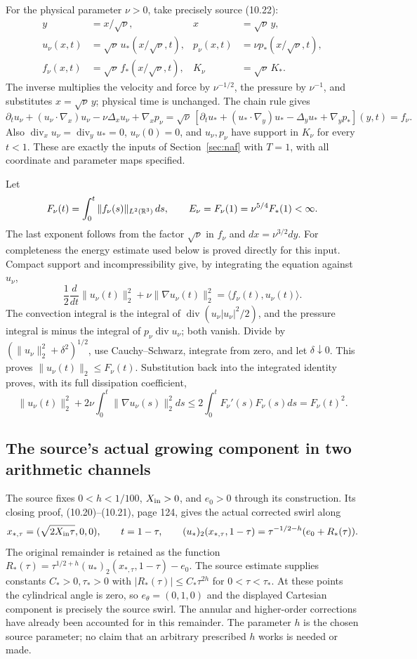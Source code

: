 For the physical parameter $\nu>0$, take precisely source (10.22):
\begin{align*}
 y&=x/\sqrt\nu, & x&=\sqrt\nu\,y,\\
 u_\nu(x,t)&=\sqrt\nu\,u_*(x/\sqrt\nu,t),&
 p_\nu(x,t)&=\nu p_*(x/\sqrt\nu,t),\\
 f_\nu(x,t)&=\sqrt\nu\,f_*(x/\sqrt\nu,t),&
 K_\nu&=\sqrt\nu\,K_*.
\end{align*}
The inverse multiplies the velocity and force by $\nu^{-1/2}$,
the pressure by $\nu^{-1}$, and substitutes $x=\sqrt\nu\,y$;
physical time is unchanged. The chain rule gives
\[
 \partial_tu_\nu+(u_\nu\cdot\nabla_x)u_\nu
       -\nu\Delta_xu_\nu+\nabla_xp_\nu
 =\sqrt\nu\,[\partial_tu_*+(u_*\cdot\nabla_y)u_*
                    -\Delta_yu_*+\nabla_yp_*](y,t)=f_\nu.
\]
Also $\operatorname{div}_xu_\nu=\operatorname{div}_yu_*=0$,
$u_\nu(0)=0$, and $u_\nu,p_\nu$ have support in $K_\nu$ for every
$t<1$. These are exactly the inputs of Section~\ref{sec:naf} with
$T=1$, with all coordinate and parameter maps specified.

Let
\[
 F_\nu(t)=\int_0^t\|f_\nu(s)\|_{L^2(\mathbb R^3)}\,ds,
 \qquad E_\nu=F_\nu(1)=\nu^{5/4}F_*(1)<\infty.
\]
The last exponent follows from the factor $\sqrt\nu$ in $f_\nu$ and
$dx=\nu^{3/2}dy$. For completeness the energy estimate used below is
proved directly for this input. Compact support and incompressibility
give, by integrating the equation against $u_\nu$,
\[
 \frac12\frac{d}{dt}\|u_\nu(t)\|_2^2
       +\nu\|\nabla u_\nu(t)\|_2^2
       =\langle f_\nu(t),u_\nu(t)\rangle.
\]
The convection integral is the integral of
$\operatorname{div}(u_\nu|u_\nu|^2/2)$, and the pressure integral is
minus the integral of $p_\nu\operatorname{div}u_\nu$; both vanish.
Divide by $(\|u_\nu\|_2^2+\delta^2)^{1/2}$, use Cauchy--Schwarz,
integrate from zero, and let $\delta\downarrow0$. This proves
$\|u_\nu(t)\|_2\leq F_\nu(t)$. Substitution back into the integrated
identity proves, with its full dissipation coefficient,
\[
 \|u_\nu(t)\|_2^2+2\nu\int_0^t\|\nabla u_\nu(s)\|_2^2ds
 \leq 2\int_0^t F_\nu'(s)F_\nu(s)ds=F_\nu(t)^2.
\]

\subsection*{The source's actual growing component in two arithmetic channels}

The source fixes $0<h<1/100$, $X_{\rm in}>0$, and $e_0>0$ through
its construction. Its closing proof, (10.20)--(10.21), page 124, gives
the actual corrected swirl along
\[
 x_{*,\tau}=(\sqrt{2X_{\rm in}\tau},0,0),\qquad t=1-\tau,
 \qquad
 (u_*)_2(x_{*,\tau},1-\tau)
   =\tau^{-1/2-h}(e_0+R_*(\tau)).
\]
The original remainder is retained as the function
$R_*(\tau)=\tau^{1/2+h}(u_*)_2(x_{*,\tau},1-\tau)-e_0$.
The source estimate supplies constants $C_*>0,\tau_*>0$ with
$|R_*(\tau)|\leq C_*\tau^{2h}$ for $0<\tau<\tau_*$.
At these points the cylindrical angle is zero, so
$e_\theta=(0,1,0)$ and the displayed Cartesian component is precisely
the source swirl. The annular and higher-order corrections have already
been accounted for in this remainder. The parameter $h$ is the chosen
source parameter; no claim that an arbitrary prescribed $h$ works is
needed or made.

